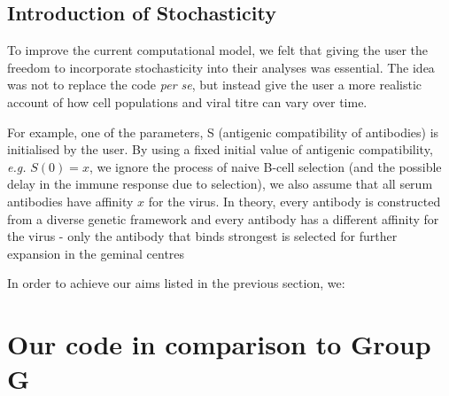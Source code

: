 \documentclass[a4paper, 12pt]{report}
\begin{document}
\section{Introduction of Stochasticity} %
To improve the current computational model, we felt that giving the user the freedom to incorporate stochasticity into their analyses was essential. The idea was not to replace the code \emph{per se}, but instead give the user a more realistic account of how cell populations and viral titre can vary over time.

For example, one of the parameters, S (antigenic compatibility of antibodies) is initialised by the user. By using a fixed initial value of antigenic compatibility, \emph{e.g.} $S(0) = x$, we ignore the process of naive B-cell selection (and the possible delay in the immune response due to selection), we also assume that all serum antibodies have affinity $x$ for the virus. In theory, every antibody is constructed from a diverse genetic framework and every antibody has a different affinity for the virus - only the antibody that binds strongest is selected for further expansion in the geminal centres %


In order to achieve our aims listed in the previous section, we:



\chapter{Our code in comparison to Group G}



\end{document}

